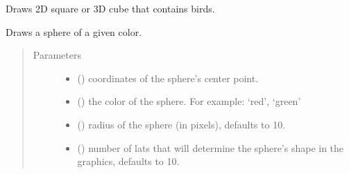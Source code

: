 \documentclass[a4paper,11pt,oneside,english]{sphinxmanual}
\begin{document}

\begin{fulllineitems}
\label{\detokenize{graphics:graphics.draw_container}}
Draws 2D square or 3D cube that contains birds.

\bigskip 
\bigskip 

\end{fulllineitems}


\begin{fulllineitems}
\label{\detokenize{graphics:graphics.draw_sphere}}
Draws a sphere of a given color.
\begin{quote}\begin{description}
\item[{Parameters}] \leavevmode\begin{itemize}
\item {} 
 () \textendash{} coordinates of the sphere’s center point.

\item {} 
 () \textendash{} the color of the sphere. For example: ‘red’, ‘green’

\item {} 
 (\sphinxstyleliteralemphasis{\sphinxupquote{, }}) \textendash{} radius of the sphere (in pixels), defaults to 10.

\item {} 
 (\sphinxstyleliteralemphasis{\sphinxupquote{, }}) \textendash{} number of lats that will determine the sphere’s shape in the graphics, defaults to 10.


\end{itemize}
\end{description}
\end{quote}
\end{fulllineitems}
\end{document}
